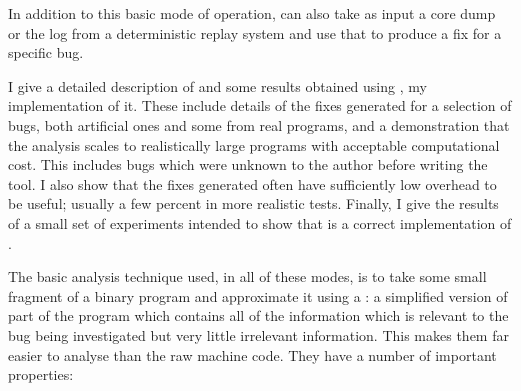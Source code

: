 
In addition to this basic mode of operation, \technique{} can also
take as input a core dump or the log from a deterministic replay
system and use that to produce a fix for a specific bug.

I give a detailed description of \technique{} and some results obtained
using \implementation, my implementation of it.  These include details
of the fixes generated for a selection of bugs, both artificial ones
and some from real programs, and a demonstration that the analysis
scales to realistically large programs with acceptable computational
cost.  This includes bugs which were unknown to the author before
writing the tool.  I also show that the fixes generated
often have sufficiently low overhead to be useful; usually a few
percent in more realistic tests.  Finally, I give the results of a
small set of experiments intended to show that \implementation{} is a
correct implementation of \technique{}.

The basic analysis technique used, in all of these modes, is to take
some small fragment of a binary program and approximate it using a
\StateMachine{}: a
simplified version of part of the program which contains all of the
information which is relevant to the bug being investigated but very
little irrelevant information.  This makes them far easier to analyse
than the raw machine code.  They have a number of important
properties:

